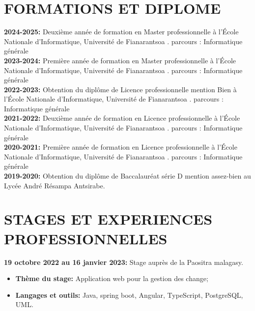 \documentclass[12pt]{book}
\begin{document}
			\section{FORMATIONS ET DIPLOME}
			\begin{minipage}{\textwidth}
				\textbf{2024-2025:} Deuxième année de formation en Master professionnelle à l’École Nationale d'Informatique, Université de Fianarantsoa . parcours : Informatique générale\\
				\textbf{2023-2024:} Première année de formation en Master professionnelle à l’École Nationale d'Informatique, Université de Fianarantsoa . parcours : Informatique générale\\
				\textbf{2022-2023:} Obtention du diplôme de Licence professionnelle mention Bien à l’École Nationale d'Informatique, Université de Fianarantsoa . parcours : Informatique générale\\
				\textbf{2021-2022:} Deuxième année de formation en Licence professionnelle à l’École Nationale d'Informatique, Université de Fianarantsoa . parcours : Informatique générale\\
				\textbf{2020-2021:} Première année de formation en Licence professionnelle à l’École Nationale d'Informatique, Université de Fianarantsoa . parcours : Informatique générale\\
				\textbf{2019-2020:} Obtention du diplôme de Baccalauréat série D mention assez-bien au Lycée André Résampa Antsirabe.
			\end{minipage}
			\section{STAGES ET EXPERIENCES PROFESSIONNELLES}
				\begin{minipage}{\textwidth}
       					 \textbf{19 octobre 2022 au 16 janvier 2023:} Stage auprès de la Paositra malagasy.
						\begin{itemize}
							\item \textbf{Thème du stage:} Application web pour la gestion des change;
							\item \textbf{Langages et outils:} Java, spring boot, Angular, TypeScript, PostgreSQL, UML.								
						\end{itemize}
    				\end{minipage}		
\end{document}
